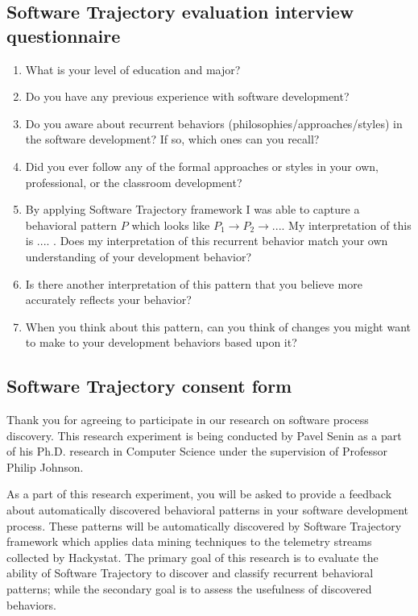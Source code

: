 \subsection{Software Trajectory evaluation interview questionnaire}
\begin{enumerate}
	\item What is your level of education and major?
	\item Do you have any previous experience with software development?
	\item Do you aware about recurrent behaviors (philosophies/approaches/styles) in the software development? If so, which ones can you recall? 
	\item Did you ever follow any of the formal approaches or styles in your own, professional, or the classroom development?
	\item By applying Software Trajectory framework I was able to capture a behavioral pattern $P$ which looks like $P_{1} \rightarrow P_{2} \rightarrow ...$. My interpretation of this is .... . Does my interpretation of this recurrent behavior match your own understanding of your development behavior? 
	\item Is there another interpretation of this pattern that you believe more accurately reflects your behavior?
	\item When you think about this pattern, can you think of changes you might want to make to your development behaviors based upon it? 
\end{enumerate}

\clearpage

\subsection{Software Trajectory consent form}
Thank you for agreeing to participate in our research on software process discovery.  
This research experiment is being conducted by Pavel Senin as a part of his Ph.D. research in Computer Science under the supervision of Professor Philip Johnson.

As a part of this research experiment, you will be asked to provide a feedback about automatically discovered behavioral patterns in your software development process. These patterns will be automatically discovered by Software Trajectory framework which applies data mining techniques to the telemetry streams collected by Hackystat. The primary goal of this research is to evaluate the ability of Software Trajectory to discover and classify recurrent behavioral patterns; while the secondary goal is to assess the usefulness of discovered behaviors. 

